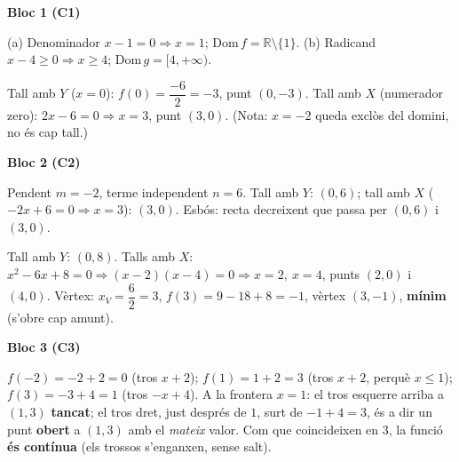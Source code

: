 \newpage
\begin{solucions}

\noindent\textbf{Bloc 1 (C1)}
\begin{sollist}
  \item (a) Denominador $x-1=0 \Rightarrow x=1$; $\mathrm{Dom}\,f=\mathbb{R}\setminus\{1\}$. \quad
        (b) Radicand $x-4\ge 0 \Rightarrow x\ge 4$; $\mathrm{Dom}\,g=[4,+\infty)$.
  \item Tall amb $Y$ ($x=0$): $f(0)=\dfrac{-6}{2}=-3$, punt $(0,-3)$. Tall amb $X$
        (numerador zero): $2x-6=0 \Rightarrow x=3$, punt $(3,0)$.
        (Nota: $x=-2$ queda exclòs del domini, no és cap tall.)
\end{sollist}

\noindent\textbf{Bloc 2 (C2)}
\begin{sollist}\setcounter{enumi}{2}
  \item Pendent $m=-2$, terme independent $n=6$. Tall amb $Y$: $(0,6)$; tall amb $X$
        ($-2x+6=0 \Rightarrow x=3$): $(3,0)$. Esbós: recta decreixent que passa per
        $(0,6)$ i $(3,0)$.
  \item Tall amb $Y$: $(0,8)$. Talls amb $X$: $x^2-6x+8=0 \Rightarrow (x-2)(x-4)=0
        \Rightarrow x=2,\ x=4$, punts $(2,0)$ i $(4,0)$. Vèrtex:
        $x_V=\dfrac{6}{2}=3$, $f(3)=9-18+8=-1$, vèrtex $(3,-1)$, \textbf{mínim}
        (s'obre cap amunt).
\end{sollist}

\noindent\textbf{Bloc 3 (C3)}
\begin{sollist}\setcounter{enumi}{4}
  \item $f(-2)=-2+2=0$ (tros $x+2$); $f(1)=1+2=3$ (tros $x+2$, perquè $x\le 1$);
        $f(3)=-3+4=1$ (tros $-x+4$). A la frontera $x=1$: el tros esquerre arriba a
        $(1,3)$ \textbf{tancat}; el tros dret, just després de $1$, surt de
        $-1+4=3$, és a dir un punt \textbf{obert} a $(1,3)$ amb el \emph{mateix}
        valor. Com que coincideixen en $3$, la funció \textbf{és contínua} (els
        trossos s'enganxen, sense salt).
\end{sollist}


\end{solucions}
